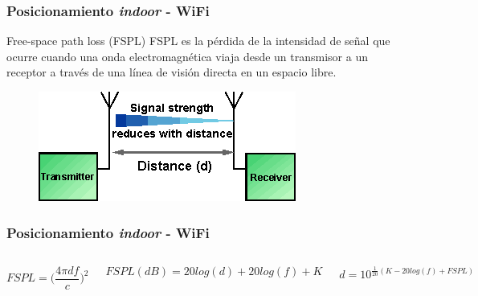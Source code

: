 \documentclass[mathserif]{beamer}
\begin{document}

\begin{frame}
\frametitle{Posicionamiento \textit{indoor} - WiFi}

\begin{block}{Free-space path loss (FSPL)}
FSPL es la pérdida de la intensidad de señal que ocurre cuando una onda electromagnética viaja desde un transmisor a un receptor a través de una línea de visión directa en un espacio libre.	
\end{block}

\begin{figure}
\includegraphics[width=.65\textwidth]{../figures_chesta/estado_del_arte/fspl}
\end{figure}

\end{frame}

\begin{frame}
\frametitle{Posicionamiento \textit{indoor} - WiFi}

\begin{columns}


\begin{equation*}
FSPL=\Bigg(\frac{4\pi df}{c}\Bigg)^2
\end{equation*}

\begin{equation*}
FSPL(dB)=20 log(d)+20 log(f) + K
\end{equation*}

\begin{equation*}
d=10^{\frac{1}{20}(K-20 log(f)+FSPL)}
\end{equation*}


\begin{figure}
\includegraphics[width=\textwidth]{../figures_chesta/estado_del_arte/fspl}
\end{figure}

\end{columns}

\end{frame}
\end{document}
